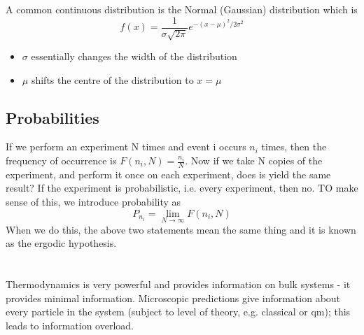 \documentclass[a4paper, 11pt, normalem]{report}
\begin{document}
A common continuous distribution is the Normal (Gaussian) distribution which is
\begin{equation}
    f(x) = \frac{1}{\sigma\sqrt{2\pi}}e^{-(x-\mu)^2/2\sigma^2}
\end{equation}
\begin{itemize}
    \item $\sigma$ essentially changes the width of the distribution
    \item $\mu$ shifts the centre of the distribution to $x=\mu$
\end{itemize}

\section{Probabilities}
If we perform an experiment N times and event i occurs $n_i$ times, then the frequency of occurrence is $F(n_i, N) = \frac{n_i}{N}$.
Now if we take N copies of the experiment, and perform it once on each experiment, does is yield the same result?
If the experiment is probabilistic, i.e. every experiment, then no. 
TO make sense of this, we introduce probability as
\begin{equation}
    P_{n_i} = \lim_{N\to\infty} F(n_i, N)
\end{equation}
When we do this, the above two statements mean the same thing and it is known as the ergodic hypothesis.

\chapter{}
Thermodynamics is very powerful and provides information on bulk systems - it provides minimal information. 
Microscopic predictions give information about every particle in the system (subject to level of theory, e.g. classical or qm); this leads to information overload. 
\end{document}
